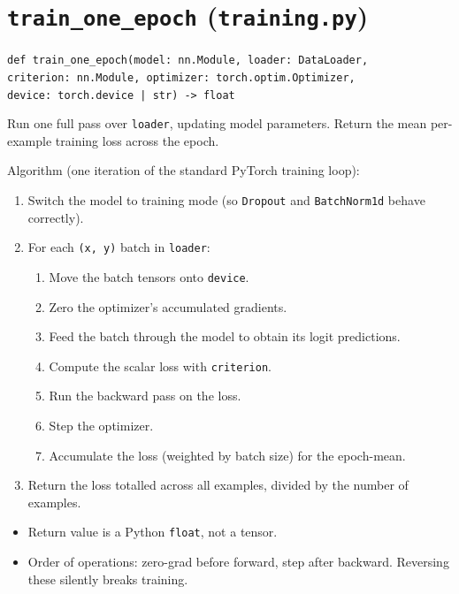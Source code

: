 \documentclass[11pt]{article}
\newcommand{\code}[1]{\texttt{\small #1}}
\begin{document}
\section{\texttt{train\_one\_epoch} (\texttt{training.py})}

\noindent
\code{def train\_one\_epoch(model: nn.Module, loader: DataLoader,}\\
\code{\hspace*{2em}criterion: nn.Module, optimizer: torch.optim.Optimizer,}\\
\code{\hspace*{2em}device: torch.device | str) -> float}

\medskip\noindent
Run one full pass over \code{loader}, updating model parameters. Return the
mean per-example training loss across the epoch.

\medskip\noindent
Algorithm (one iteration of the standard PyTorch training loop):

\begin{enumerate}
    \item Switch the model to training mode (so \code{Dropout} and
          \code{BatchNorm1d} behave correctly).
    \item For each \code{(x, y)} batch in \code{loader}:
    \begin{enumerate}
        \item Move the batch tensors onto \code{device}.
        \item Zero the optimizer's accumulated gradients.
        \item Feed the batch through the model to obtain its logit predictions.
        \item Compute the scalar loss with \code{criterion}.
        \item Run the backward pass on the loss.
        \item Step the optimizer.
        \item Accumulate the loss (weighted by batch size) for the
              epoch-mean.
    \end{enumerate}
    \item Return the loss totalled across all examples, divided by the
          number of examples.
\end{enumerate}

\begin{itemize}
    \item Return value is a Python \code{float}, not a tensor.
    \item Order of operations: zero-grad before forward, step after
          backward. Reversing these silently breaks training.
\end{itemize}
\end{document}
